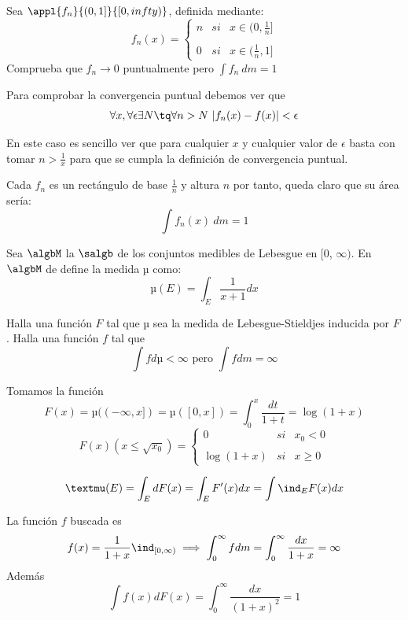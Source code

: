 \begin{problem}[11]
Sea $\appl{f_n}{(0,1]}{[0, infty)}$, definida mediante:
\[f_n(x)= \left\{ \begin{array}{lcc}
             n &   si  & x \in (0, \frac{1}{n}] \\
             \\ 0 &  si  & x \in (\frac{1}{n}, 1]
             \end{array}
   \right.\]
Comprueba que $f_n \rightarrow 0$ puntualmente pero $\int f_n \ dm = 1$

\solution

Para comprobar la convergencia puntual debemos ver que
\[\forall x, \forall \epsilon \exists N \tq \forall n > N \ |f_n(x)-f(x)| < \epsilon\]

En este caso es sencillo ver que para cualquier $x$ y cualquier valor de $\epsilon$ basta con tomar $n>\frac{1}{x}$ para que se cumpla la definición de convergencia puntual.

Cada $f_n$ es un rectángulo de base $\frac{1}{n}$ y altura $n$ por tanto, queda claro que su área sería:
\[\int f_n(x) \ dm= 1\]
\end{problem}

\begin{problem}[12]
Sea $\algbM$ la $\salgb$ de los conjuntos medibles de Lebesgue en [0, $\infty)$. En $\algbM$ de define la medida µ como:
\[µ(E) = \int_E \frac{1}{x+1} dx\]

Halla una función $F$ tal que µ sea la medida de Lebesgue-Stieldjes inducida por $F$. Halla una función $f$ tal que
\[\int f dµ < \infty \text{ pero } \int f dm = \infty\]

\solution

Tomamos la función
\[F(x) = µ((-\infty, x]) = µ([0,x]) = \int_0^x \frac{dt}{1+t}=\log (1+x)\]
\[
F(x) (x \leq \sqrt{x_0})= \left\{ \begin{array}{lcc}
             0 & si & x_0 < 0 \\
             \\ \log(1+x) &  si & x \geq 0
             \end{array}
   \right.
\]

\obs \[µ(E) = \int_E dF(x) = \int_E F'(x) dx = \int \ind_E F(x) dx\]

La función $f$ buscada es
\[f(x) = \frac{1}{1+x}\ind_{[0, \infty)} \implies \int_0^{\infty} f dm = \int_0^{\infty} \frac{dx}{1+x} = \infty\]
Además
\[\int f(x) dF(x) = \int_0^{\infty} \frac{dx}{(1+x)^2} = 1\]

\end{problem}

